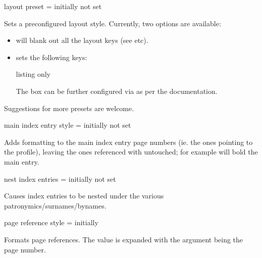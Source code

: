 \documentclass[
	a4paper,
]{article}
\begin{document}
\begin{docKey}
	{layout preset}
	{=}
	{initially not set}

	Sets a preconfigured layout style. Currently, two options are available:

	\begin{itemize}
		\item {} will blank out all the layout keys (see  etc).

		\item {} sets the following keys:

		\begin{tcblisting}{listing only}
		\end{tcblisting}

		The box can be further configured via  as per the  documentation.

	\end{itemize}

	Suggestions for more presets are welcome.

\end{docKey}

\begin{docKey}
	{main index entry style}
	{=}
	{initially not set}

	Adds formatting to the main index entry page numbers (ie. the ones pointing to the profile), leaving the ones referenced with  untouched; for example  will bold the main entry.
\end{docKey}

\begin{docKey}
	{nest index entries}
	{=}
	{initially not set}

	Causes index entries to be nested under the various patronymics/surnames/bynames.
\end{docKey}

\begin{docKey}
	{page reference style}
	{=}
	{initially }

	Formats page references. The value is expanded with the argument  being the page number.
\end{docKey}
\end{document}
